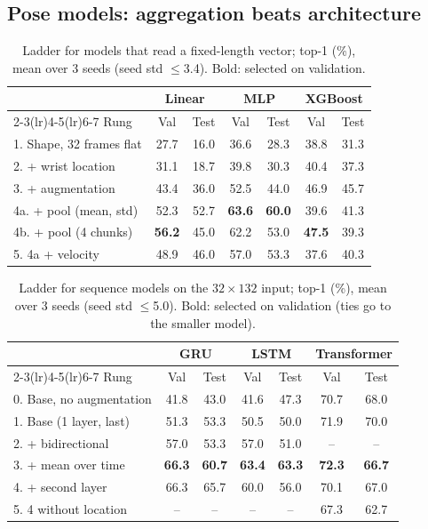 \documentclass{article}
\begin{document}
\subsection{Pose models: aggregation beats architecture}\label{sec:pose}
\begin{table}[t]
\centering\footnotesize\setlength{\tabcolsep}{2.5pt}
\begin{tabular}{lcccccc}
\toprule
 & \multicolumn{2}{c}{Linear} & \multicolumn{2}{c}{MLP} & \multicolumn{2}{c}{XGBoost} \\
\cmidrule(lr){2-3}\cmidrule(lr){4-5}\cmidrule(lr){6-7}
Rung & Val & Test & Val & Test & Val & Test \\
\midrule
1. Shape, 32 frames flat & 27.7 & 16.0 & 36.6 & 28.3 & 38.8 & 31.3 \\
2. + wrist location      & 31.1 & 18.7 & 39.8 & 30.3 & 40.4 & 37.3 \\
3. + augmentation        & 43.4 & 36.0 & 52.5 & 44.0 & 46.9 & 45.7 \\
4a. + pool (mean, std)   & 52.3 & 52.7 & \textbf{63.6} & \textbf{60.0} & 39.6 & 41.3 \\
4b. + pool (4 chunks)    & \textbf{56.2} & 45.0 & 62.2 & 53.0 & \textbf{47.5} & 39.3 \\
5. 4a + velocity         & 48.9 & 46.0 & 57.0 & 53.3 & 37.6 & 40.3 \\
\bottomrule
\end{tabular}
\caption{Ladder for models that read a fixed-length vector; top-1 (\%), mean over 3 seeds (seed std
$\le$3.4). Bold: selected on validation.}
\label{tab:pooled}
\end{table}

\begin{table}[t]
\centering\footnotesize\setlength{\tabcolsep}{2.5pt}
\begin{tabular}{lcccccc}
\toprule
 & \multicolumn{2}{c}{GRU} & \multicolumn{2}{c}{LSTM} & \multicolumn{2}{c}{Transformer} \\
\cmidrule(lr){2-3}\cmidrule(lr){4-5}\cmidrule(lr){6-7}
Rung & Val & Test & Val & Test & Val & Test \\
\midrule
0. Base, no augmentation   & 41.8 & 43.0 & 41.6 & 47.3 & 70.7 & 68.0 \\
1. Base (1 layer, last)    & 51.3 & 53.3 & 50.5 & 50.0 & 71.9 & 70.0 \\
2. + bidirectional         & 57.0 & 53.3 & 57.0 & 51.0 & -- & -- \\
3. + mean over time        & \textbf{66.3} & \textbf{60.7} & \textbf{63.4} & \textbf{63.3} & \textbf{72.3} & \textbf{66.7} \\
4. + second layer          & 66.3 & 65.7 & 60.0 & 56.0 & 70.1 & 67.0 \\
5. 4 without location      & -- & -- & -- & -- & 67.3 & 62.7 \\
\bottomrule
\end{tabular}
\caption{Ladder for sequence models on the $32\times132$ input; top-1 (\%), mean over 3 seeds (seed std
$\le$5.0). Bold: selected on validation (ties go to the smaller model).}
\label{tab:seq}
\end{table}
\end{document}
